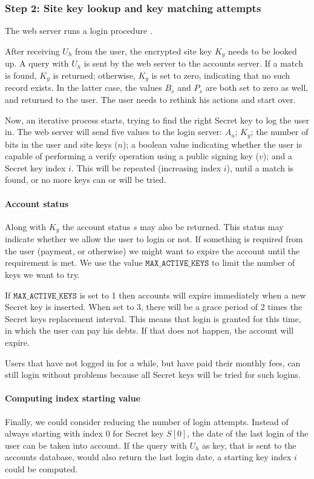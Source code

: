 \subsubsection{Step 2: Site key lookup and key matching attempts}
\label{sec:login_step2}
The web server runs a login procedure%
.
\par
After receiving $U_h$ from the user, the encrypted site key $K_y$ needs to be looked up.
A query with $U_h$ is sent by the web server to the accounts server.
If a match is found, $K_y$ is returned;
otherwise, $K_y$ is set to zero, indicating that no such record exists.
In the latter case, the values $B_s$ and $P_s$ are both set to zero as well, and returned to the user.
The user needs to rethink his actions and start over.
\par
Now,
an iterative process starts,
trying to find the right Secret key to log the user in.
The web server will send five values to the login server:
$A_u$;
$K_y$;
the number of bits in the user and site keys ($n$);
a boolean value indicating whether the user is capable of performing a verify operation using a public signing key ($v$);
and a Secret key index $i$.
This will be repeated
(increasing index $i$),
until a match is found,
or no more keys can or will be tried.
\paragraph{Account status}
Along with $K_y$ the account status $s$ may also be returned.
This status may indicate whether we allow the user to login or not.
If something is required from the user
(payment, or otherwise)
we might want to expire the account until the requirement is met.
We use the value $\mathtt{MAX\_ACTIVE\_KEYS}$ to limit the number of keys we want to try.
\par
If $\mathtt{MAX\_ACTIVE\_KEYS}$ is set to 1 then accounts will expire immediately when a new Secret key is inserted.
When set to 3,
there will be a grace period of 2 times the Secret keys replacement interval.
This means that login is granted for this time,
in which the user can pay his debts.
If that does not happen,
the account will expire.
\par
Users that have not logged in for a while,
but have paid their monthly fees,
can still login without problems because all Secret keys will be tried for such logins.
\paragraph{Computing index starting value}
Finally, we could consider reducing the number of login attempts.
Instead of always starting with index $0$ for Secret key $S[0]$,
the date of the last login of the user can be taken into account.
If the query with $U_h$ as key,
that is sent to the accounts database,
would also return the last login date,
a starting key index $i$ could be computed.

